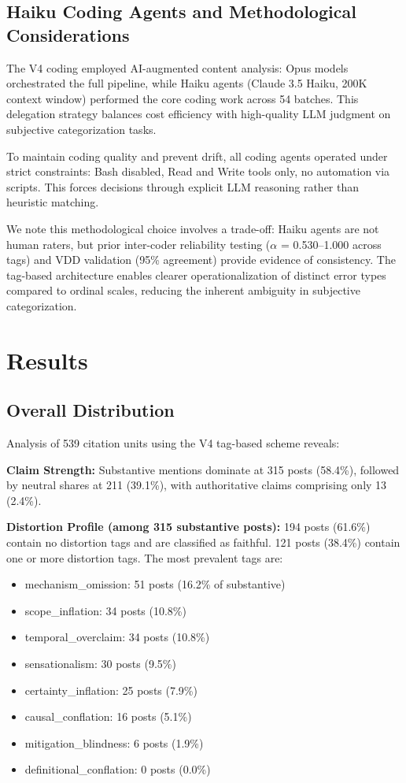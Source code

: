 \documentclass[twocolumn,11pt]{article}
\begin{document}
\subsection{Haiku Coding Agents and Methodological Considerations}

The V4 coding employed AI-augmented content analysis: Opus models orchestrated the full pipeline, while Haiku agents (Claude 3.5 Haiku, 200K context window) performed the core coding work across 54 batches. This delegation strategy balances cost efficiency with high-quality LLM judgment on subjective categorization tasks.

To maintain coding quality and prevent drift, all coding agents operated under strict constraints: Bash disabled, Read and Write tools only, no automation via scripts. This forces decisions through explicit LLM reasoning rather than heuristic matching.

We note this methodological choice involves a trade-off: Haiku agents are not human raters, but prior inter-coder reliability testing ($\alpha$ = 0.530--1.000 across tags) and VDD validation (95\% agreement) provide evidence of consistency. The tag-based architecture enables clearer operationalization of distinct error types compared to ordinal scales, reducing the inherent ambiguity in subjective categorization.

\section{Results}

\subsection{Overall Distribution}

Analysis of 539 citation units using the V4 tag-based scheme reveals:

\textbf{Claim Strength:} Substantive mentions dominate at 315 posts (58.4\%), followed by neutral shares at 211 (39.1\%), with authoritative claims comprising only 13 (2.4\%).

\textbf{Distortion Profile (among 315 substantive posts):} 194 posts (61.6\%) contain no distortion tags and are classified as faithful. 121 posts (38.4\%) contain one or more distortion tags. The most prevalent tags are:
\begin{itemize}
\item mechanism\_omission: 51 posts (16.2\% of substantive)
\item scope\_inflation: 34 posts (10.8\%)
\item temporal\_overclaim: 34 posts (10.8\%)
\item sensationalism: 30 posts (9.5\%)
\item certainty\_inflation: 25 posts (7.9\%)
\item causal\_conflation: 16 posts (5.1\%)
\item mitigation\_blindness: 6 posts (1.9\%)
\item definitional\_conflation: 0 posts (0.0\%)
\end{itemize}
\end{document}
